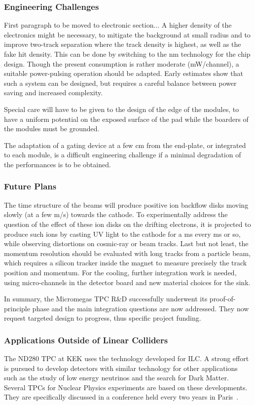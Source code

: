 \subsubsection{Engineering Challenges}
First paragraph to be moved to electronic section...
A higher density of the electronics might be necessary, to mitigate the background at small radius and to improve two-track separation
where the track density is highest, as well as the fake hit density. This can be done by switching to the \unit[65]{nm} technology for the
chip design. Though the present consumption is rather moderate (\unit[15]{mW/channel}), a suitable power-pulsing operation should be adapted.
Early estimates show that such a system can be designed, but requires a careful balance between power saving and increased complexity.

Special care will have to be given to the design of the edge of the modules, to have a uniform potential on the exposed surface of the pad while the boarders of the modules must be grounded.

The adaptation of a gating device at a few cm from the end-plate, or integrated to each module, is a
difficult engineering challenge if a minimal degradation of the performances is to be obtained.


\subsubsection{Future Plans}
The time structure of the beams will produce positive ion backflow disks moving slowly (at a few \unit[1]{m/s}) towards the cathode. To experimentally address the question of the effect of these ion disks on the drifting electrons, it is projected to produce such
ions by casting UV light to the cathode for a ms every \unit[100]{ms} or so, while observing distortions on cosmic-ray or beam tracks.
Last but not least, the momentum resolution should be evaluated with long tracks from a particle beam, which requires a silicon
tracker inside the magnet to measure precisely the track position and momentum. For the cooling, further integration work is needed, using micro-channels in the detector board and new material choices for the sink.

In summary, the Micromegas TPC R\&D successfully underwent its proof-of-principle phase and the main integration questions are now addressed. They now request targeted design to progress, thus specific project funding.


\subsubsection{Applications Outside of Linear Colliders}
The ND280 TPC at KEK uses the technology developed for ILC.
A strong effort is pursued to develop detectors with similar technology for other applications such as
the study of low energy neutrinos and the search for Dark Matter.
Several TPCs for Nuclear Physics experiments are based on these developments. They are specifically discussed in a
conference held every two years in Paris~\cite{tpcconf}.
